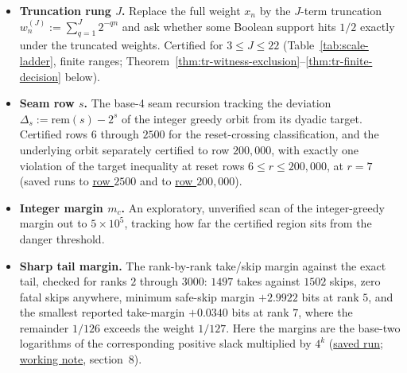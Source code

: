 \begin{itemize}
\item \textbf{Truncation rung $J$.} Replace the full weight $x_n$ by the $J$-term truncation
$w_n^{(J)}:=\sum_{q=1}^{J}2^{-qn}$ and ask whether some Boolean support hits $1/2$ exactly under
the truncated weights. Certified for $3\le J\le22$ (Table~\ref{tab:scale-ladder}, finite ranges;
Theorem~\ref{thm:tr-witness-exclusion}--\ref{thm:tr-finite-decision} below).
\item \textbf{Seam row $s$.} The base-4 seam recursion tracking the deviation $\Delta_s:=\mathrm{rem}(s)-2^s$
of the integer greedy orbit from its dyadic target. Certified rows $6$ through $2500$ for the
reset-crossing classification, and the underlying orbit separately certified to row
$200{,}000$, with exactly one violation of the target inequality at reset rows $6\le r\le200{,}000$, at $r=7$
(saved runs to
\href{https://github.com/wcook04/plectis-erdos/blob/f757115e03bebe5c04431a147da559015c680a37/research/experiments/erdos257/receipts/seam-reset-crossing-2500.json}{row $2500$}
and to
\href{https://github.com/wcook04/plectis-erdos/blob/f757115e03bebe5c04431a147da559015c680a37/research/experiments/erdos257/receipts/seam-orbit-200000.json}{row $200{,}000$}).
\item \textbf{Integer margin $m_c$.} An exploratory, unverified scan of the integer-greedy
margin out to $5\times10^5$, tracking how far the certified region sits from the danger
threshold.
\item \textbf{Sharp tail margin.} The rank-by-rank take/skip margin against the exact tail, checked
for ranks $2$ through $3000$: $1497$ takes against $1502$ skips, zero fatal skips anywhere, minimum
safe-skip margin $+2.9922$ bits at rank $5$, and the smallest
reported take-margin $+0.0340$ bits at rank $7$, where the remainder
$1/126$ exceeds the weight $1/127$.  Here the margins are the base-two
logarithms of the corresponding positive slack multiplied by $4^k$
(\href{https://github.com/wcook04/plectis-erdos/blob/f757115e03bebe5c04431a147da559015c680a37/research/experiments/erdos257/receipts/tail-margins-3000.json}{saved run};
\href{https://github.com/wcook04/plectis-erdos/blob/f757115e03bebe5c04431a147da559015c680a37/research/experiments/erdos257/notes/reset-crossing-unification-2026-07-24.md}{working note},
section~8).
\end{itemize}

